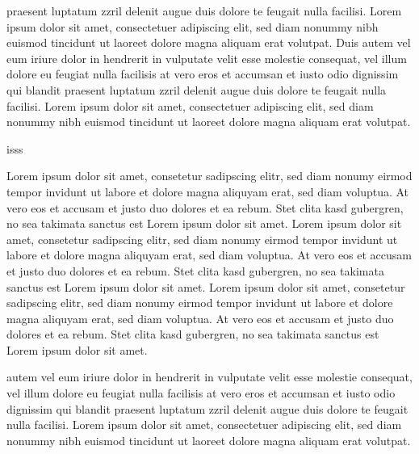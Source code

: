 \documentclass[a4paper,
	               twoside,
	               openright,
	               8pt,
	               final]
	               {memoir}
\begin{document}
\begin{pairs}
\begin{Rightside}
praesent luptatum zzril delenit augue duis dolore te feugait nulla facilisi. Lorem ipsum dolor sit
amet, consectetuer adipiscing elit, sed diam nonummy nibh euismod tincidunt ut laoreet dolore magna
aliquam erat volutpat.
Duis autem vel eum iriure dolor in hendrerit in vulputate velit esse molestie consequat, vel illum
dolore eu feugiat nulla facilisis at vero eros et accumsan et iusto odio dignissim qui blandit
praesent luptatum zzril delenit augue duis dolore te feugait nulla facilisi. Lorem ipsum dolor sit
amet, consectetuer adipiscing elit, sed diam nonummy nibh euismod tincidunt ut laoreet dolore magna
aliquam erat volutpat.
				\pend%
			\pausenumbering%
		\end{Rightside}%
	\end{pairs}%
\Columns%
\pagebreak
isss
	\begin{pairs}%
		\begin{Leftside}%
			\resumenumbering%
				\pstart%
 Lorem ipsum dolor sit amet, consetetur sadipscing elitr, sed diam nonumy eirmod tempor invidunt ut
labore et dolore magna aliquyam erat, sed diam voluptua. At vero eos et accusam et justo duo
dolores et ea rebum. Stet clita kasd gubergren, no sea takimata sanctus est Lorem ipsum dolor sit
amet. Lorem ipsum dolor sit amet, consetetur sadipscing elitr, sed diam nonumy eirmod tempor
invidunt ut labore et dolore magna aliquyam erat, sed diam voluptua. At vero eos et accusam et
justo duo dolores et ea rebum. Stet clita kasd gubergren, no sea takimata sanctus est Lorem ipsum
dolor sit amet. Lorem ipsum dolor sit amet, consetetur sadipscing elitr, sed diam nonumy eirmod
tempor invidunt ut labore et dolore magna aliquyam erat, sed diam voluptua. At vero eos et accusam
et justo duo dolores et ea rebum. Stet clita kasd gubergren, no sea takimata sanctus est Lorem
ipsum dolor sit amet.
				\pend%
			\pausenumbering%
		\end{Leftside}%
		\begin{Rightside}%
			\resumenumbering%
				\pstart%
         autem vel eum iriure dolor in hendrerit in vulputate velit esse molestie consequat, vel illum
dolore eu feugiat nulla facilisis at vero eros et accumsan et iusto odio dignissim qui blandit
praesent luptatum zzril delenit augue duis dolore te feugait nulla facilisi. Lorem ipsum dolor sit
amet, consectetuer adipiscing elit, sed diam nonummy nibh euismod tincidunt ut laoreet dolore magna
aliquam erat volutpat.
				\pend%
			\pausenumbering%
		\end{Rightside}%
	\end{pairs}%
\Columns%
\end{document}
